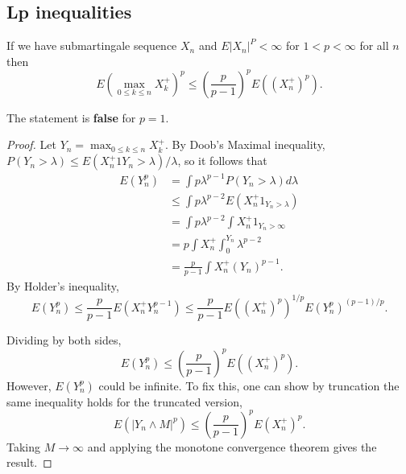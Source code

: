 \documentclass[11pt]{scrartcl}
\begin{document}
\subsection{Lp inequalities}
\begin{thm}
If we have submartingale sequence $X_n$ and $E|X_n|^P < \infty$ for $1 < p < \infty$ for all $n$ then 
$$E(\max_{0 \le k \le n} X_k^+)^p \le \left (\frac{p}{p-1}\right )^p E((X_n^+)^p).$$
\end{thm}
\begin{remark} The statement is \textbf{false} for $p = 1$.
\end{remark}
\begin{proof}
Let $Y_n = \max_{0 \le k \le n} X_k^+.$  By Doob's Maximal inequality, $P(Y_n > \lambda) \le E(X_n^+1{Y_n > \lambda})/\lambda$, so it follows that
\begin{align*}
E(Y_n^p) &= \int p\lambda^{p-1} P(Y_n > \lambda) d\lambda \\
& \le \int p\lambda^{p-2} E(X_n^+ 1_{Y_n > \lambda}) \\
&= \int p\lambda^{p-2} \int X_n^+ 1_{Y_n > \infty} \\
&= p \int X_n^+ \int_0^{Y_n} \lambda^{p-2} \\
&= \frac{p}{p-1} \int X_n^+ (Y_n)^{p-1}.
\end{align*}
By Holder's inequality,
$$E(Y_n^p) \le \frac{p}{p-1} E(X_n^+ Y_n^{p-1}) \le \frac{p}{p-1} E((X_n^+)^p)^{1/p} E(Y_n^{p})^{(p-1)/p}.$$

Dividing by both sides,
$$E(Y_n^p) \le\left( \frac{p}{p-1}\right)^pE((X_n^+)^p).$$
However, $E(Y_n^p)$ could be infinite.  To fix this, one can show by truncation the same inequality holds for the truncated version, 
$$E(|Y_n \wedge M|^p) \le \left (\frac{p}{p-1}\right )^p E(X_n^+)^p.$$
Taking $M \to \infty$ and applying the monotone convergence theorem gives the result.
\end{proof}
\end{document}
